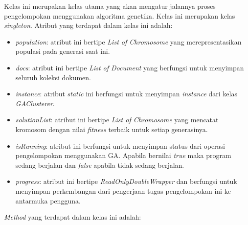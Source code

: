 Kelas ini merupakan kelas utama yang akan mengatur jalannya proses pengelompokan menggunakan algoritma genetika. Kelas ini merupakan kelas \textit{singleton}. Atribut yang terdapat dalam kelas ini adalah:

\begin{itemize}
	\item \textit{population}: atribut ini bertipe \textit{List of Chromosome} yang merepresentasikan populasi pada generasi saat ini.
	\item \textit{docs}: atribut ini bertipe \textit{List of Document} yang berfungsi untuk menyimpan seluruh koleksi dokumen.
	\item \textit{instance}: atribut \textit{static} ini berfungsi untuk menyimpan \textit{instance} dari kelas \textit{GAClusterer}.
	\item \textit{solutionList}: atribut ini bertipe \textit{List of Chromosome} yang mencatat kromosom dengan nilai \textit{fitness} terbaik untuk setiap generasinya.
	\item \textit{isRunning}: atribut ini berfungsi untuk menyimpan status dari operasi pengelompokan menggunakan GA. Apabila bernilai \textit{true} maka program sedang berjalan dan \textit{false} apabila tidak sedang berjalan.
	\item \textit{progress}: atribut ini bertipe \textit{ReadOnlyDoubleWrapper} dan berfungsi untuk menyimpan perkembangan dari pengerjaan tugas pengelompokan ini ke antarmuka pengguna.
\end{itemize}

\textit{Method} yang terdapat dalam kelas ini adalah:

